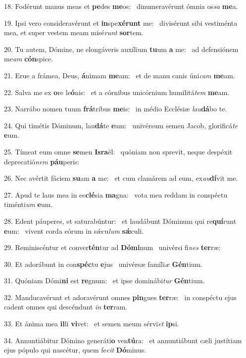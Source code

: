 18. Fodérunt manus meas et \textbf{pe}des \textbf{me}os: \ast\  dinumeravérunt ómnia os\textit{sa} \textbf{me}a.\

19. Ipsi vero consideravérunt et \textbf{in}spe\textbf{xé}\textbf{runt} me: \ast\  divisérunt sibi vestiménta mea, et super vestem meam misé\textit{runt} \textbf{sor}tem.\

20. Tu autem, Dómine, ne elongáveris auxílium \textbf{tu}um \textbf{a} me: \ast\  ad defensiónem me\textit{am} \textbf{cón}spice.\

21. Erue a frámea, Deus, \textbf{á}nimam \textbf{me}am: \ast\  et de manu canis úni\textit{cam} \textbf{me}am.\

22. Salva me ex \textbf{o}re le\textbf{ó}nis: \ast\  et a córnibus unicórnium humilitá\textit{tem} \textbf{me}am.\

23. Narrábo nomen tuum \textbf{frá}tribus \textbf{me}is: \ast\  in médio Ecclésiæ \textit{lau}\textbf{dá}bo te.\

24. Qui timétis Dóminum, lau\textbf{dá}te \textbf{e}um: \ast\  univérsum semen Jacob, glorificá\textit{te} \textbf{e}um.\

25. Tímeat eum omne \textbf{se}men \textbf{Is}\textbf{ra}ël: \ast\  quóniam non sprevit, neque despéxit deprecatió\textit{nem} \textbf{páu}peris:\

26. Nec avértit fáciem \textbf{su}am \textbf{a} me: \ast\  et cum clamárem ad eum, ex\textit{au}\textbf{dí}vit me.\

27. Apud te laus mea in ec\textbf{clé}sia \textbf{ma}gna: \ast\  vota mea reddam in conspéctu timénti\textit{um} \textbf{e}um.\

28. Edent páuperes, et saturabúntur: \dag\  et laudábunt Dóminum qui re\textbf{quí}runt \textbf{e}um: \ast\  vivent corda eórum in sǽcu\textit{lum} \textbf{sǽ}culi.\

29. Reminiscéntur et conver\textbf{tén}tur ad \textbf{Dó}\textbf{mi}num \ast\  univérsi fi\textit{nes} \textbf{ter}ræ:\

30. Et adorábunt in con\textbf{spéc}tu \textbf{e}jus \ast\  univérsæ famíli\textit{æ} \textbf{Gén}tium.\

31. Quóniam Dómi\textbf{ni} est \textbf{re}gnum: \ast\  et ipse dominábi\textit{tur} \textbf{Gén}tium.\

32. Manducavérunt et adoravérunt omnes \textbf{pin}gues \textbf{ter}ræ: \ast\  in conspéctu ejus cadent omnes qui descéndunt \textit{in} \textbf{ter}ram.\

33. Et ánima mea \textbf{il}li \textbf{vi}vet: \ast\  et semen meum sérvi\textit{et} \textbf{ip}si.\

34. Annuntiábitur Dómino generáti\textbf{o} ven\textbf{tú}ra: \ast\  et annuntiábunt cæli justítiam ejus pópulo qui nascétur, quem fe\textit{cit} \textbf{Dó}minus.\

